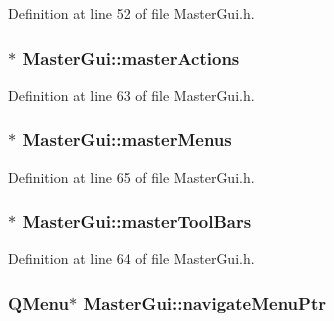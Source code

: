 Definition at line 52 of file Master\-Gui.\-h.

\hypertarget{class_master_gui_a85dc72333d336db18a92207a09db4ce3}{
\subsubsection[{master\-Actions}]{$\ast$ Master\-Gui\-::master\-Actions\hspace{0.3cm}{\ttfamily [private]}}}\label{class_master_gui_a85dc72333d336db18a92207a09db4ce3}


Definition at line 63 of file Master\-Gui.\-h.

\hypertarget{class_master_gui_a27f793278e486a5bfec69ef366199e5d}{
\subsubsection[{master\-Menus}]{$\ast$ Master\-Gui\-::master\-Menus\hspace{0.3cm}{\ttfamily [private]}}}\label{class_master_gui_a27f793278e486a5bfec69ef366199e5d}


Definition at line 65 of file Master\-Gui.\-h.

\hypertarget{class_master_gui_afb90e8f19dae43cb78c8495e5708e68b}{
\subsubsection[{master\-Tool\-Bars}]{$\ast$ Master\-Gui\-::master\-Tool\-Bars\hspace{0.3cm}{\ttfamily [private]}}}\label{class_master_gui_afb90e8f19dae43cb78c8495e5708e68b}


Definition at line 64 of file Master\-Gui.\-h.

\hypertarget{class_master_gui_aec75bd894b1c0eecea35c67ecdfcf1b0}{
\subsubsection[{navigate\-Menu\-Ptr}]{\setlength{\rightskip}{0pt plus 5cm}Q\-Menu$\ast$ Master\-Gui\-::navigate\-Menu\-Ptr\hspace{0.3cm}{\ttfamily [private]}}}\label{class_master_gui_aec75bd894b1c0eecea35c67ecdfcf1b0}


